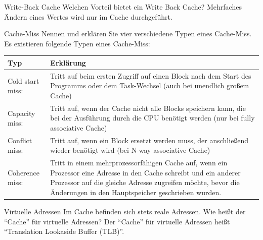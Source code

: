 \begin{aufgabe}[Caches]{Write-Back Cache}
  Welchen Vorteil bietet ein Write Back Cache?
  \tcblower
  Mehrfaches Ändern eines Wertes wird nur im Cache durchgeführt.
\end{aufgabe}

\begin{aufgabe}[Cache]{Cache-Miss}
  Nennen und erklären Sie vier verschiedene Typen eines Cache-Miss.
  \tcblower
  Es existieren folgende Typen eines Cache-Miss:\\
  \begin{tabularx}{\textwidth}{|l|X|}
    \toprule
    Typ              & Erklärung                                                                                                                                          \\
    \midrule
    Cold start miss: & Tritt auf beim ersten Zugriff auf einen Block nach dem Start des Programms oder dem Task-Wechsel (auch bei unendlich großem Cache)                 \\
    \midrule
    Capacity miss:   & Tritt auf, wenn der Cache nicht alle Blocks speichern kann, die bei der Ausführung durch die CPU benötigt werden (nur bei fully associative Cache) \\
    \midrule
    Conflict miss:   & Tritt auf, wenn ein Block ersetzt werden muss, der anschließend wieder benötigt wird (bei N-way associative Cache)                                 \\
    \midrule
    Coherence miss:  & Tritt in einem mehrprozessorfähigen Cache auf,
    wenn ein Prozessor eine Adresse in den Cache schreibt und ein anderer Prozessor auf die gleiche Adresse zugreifen möchte,
    bevor die Änderungen in den Hauptspeicher geschrieben wurden.                                                                                                         \\
    \bottomrule
  \end{tabularx}
\end{aufgabe}

\begin{aufgabe}[Cache]{Virtuelle Adressen}
  Im Cache befinden sich stets reale Adressen.
  Wie heißt der \enquote{Cache} für virtuelle Adressen?
  \tcblower
  Der \enquote{Cache} für virtuelle Adressen heißt \enquote{Translation Lookaside Buffer (TLB)}.
\end{aufgabe}

